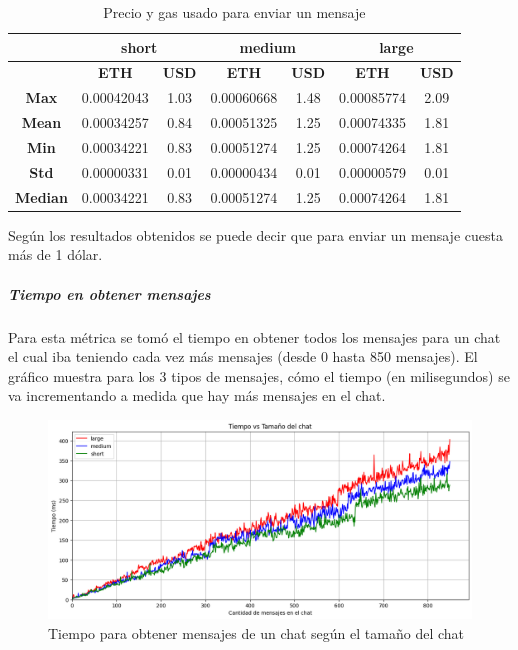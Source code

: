 \setlength\tabcolsep{10pt}
\begin{table}[H]
    \centering
    \begin{tabular}{|c|cc|cc|cc|}
    \hline
     & \multicolumn{2}{c|}{\textbf{short}} & \multicolumn{2}{c|}{\textbf{medium}} & \multicolumn{2}{c|}{\textbf{large}} \\ \hline
     & \multicolumn{1}{c|}{\textbf{ETH}} & \multicolumn{1}{c|}{\textbf{USD}} & \multicolumn{1}{c|}{\textbf{ETH}} & \multicolumn{1}{c|}{\textbf{USD}} & \multicolumn{1}{c|}{\textbf{ETH}} & \multicolumn{1}{c|}{\textbf{USD}} \\
     \hline
    \textbf{Max} & \multicolumn{1}{l|}{0.00042043} & 1.03 & \multicolumn{1}{l|}{0.00060668} & 1.48 & \multicolumn{1}{l|}{0.00085774} & 2.09 \\
    \hline
    \textbf{Mean} & \multicolumn{1}{l|}{0.00034257} & 0.84 & \multicolumn{1}{l|}{0.00051325} & 1.25 & \multicolumn{1}{l|}{0.00074335} & 1.81 \\
    \hline
    \textbf{Min} & \multicolumn{1}{l|}{0.00034221} & 0.83 & \multicolumn{1}{l|}{0.00051274} & 1.25 & \multicolumn{1}{l|}{0.00074264} & 1.81 \\
    \hline
    \textbf{Std} & \multicolumn{1}{l|}{0.00000331} & 0.01 & \multicolumn{1}{l|}{0.00000434} & 0.01 & \multicolumn{1}{l|}{0.00000579} & 0.01 \\
    \hline
    \textbf{Median} & \multicolumn{1}{l|}{0.00034221} & 0.83 & \multicolumn{1}{l|}{0.00051274} & 1.25 & \multicolumn{1}{l|}{0.00074264} & 1.81 \\
    \hline
    \end{tabular}
    \caption{Precio y gas usado para enviar un mensaje}
\end{table}

Según los resultados obtenidos se puede decir que para enviar un mensaje cuesta más de 1 dólar.

\subparagraph{Tiempo en obtener mensajes}

Para esta métrica se tomó el tiempo en obtener todos los mensajes para un chat el cual iba teniendo cada vez más mensajes (desde 0 hasta 850 mensajes). El gráfico muestra para los 3 tipos de mensajes, cómo el tiempo (en milisegundos) se va incrementando a medida que hay más mensajes en el chat.

\begin{figure}[h!]
    \centering
    \includegraphics[width=1\linewidth]{img/blockchain-get-message-graphic.png}
    \caption{Tiempo para obtener mensajes de un chat según el tamaño del chat}
    \label{fig:blockchain-get-message-graphic.png}
\end{figure}

